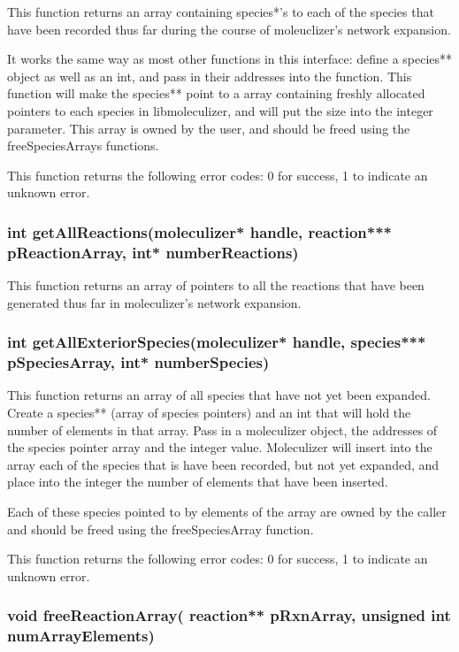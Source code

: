 This function returns an array containing species*'s to each of the
species that have been recorded thus far during the course of
moleuclizer's network expansion.  

It works the same way as most other functions in this interface:
define a species** object as well as an int, and pass in their
addresses into the function.  This function will make the species**
point to a array containing freshly allocated pointers to each species
in libmoleculizer, and will put the size into the integer parameter.
This array is owned by the user, and should be freed using the
freeSpeciesArrays functions.

This function returns the following error codes: 0 for success, 1 to
indicate an unknown error.

\subsubsection{int getAllReactions(moleculizer* handle, reaction***
  pReactionArray, int* numberReactions)}

This function returns an array of pointers to all the reactions that
have been generated thus far in moleculizer's network expansion.  


\subsubsection{int getAllExteriorSpecies(moleculizer* handle,
  species*** pSpeciesArray, int* numberSpecies)}

This function returns an array of all species that have not yet been
expanded.  Create a species** (array of species pointers) and an int
that will hold the number of elements in that array.  Pass in a
moleculizer object, the addresses of the species pointer array and the
integer value.  Moleculizer will insert into the array each of the
species that is have been recorded, but not yet expanded, and place
into the integer the number of elements that have been inserted.  

Each of these species pointed to by elements of the array are owned by
the caller and should be freed using the freeSpeciesArray function.

This function returns the following error codes: 0 for success, 1 to
indicate an unknown error.  

\subsubsection{void freeReactionArray( reaction** pRxnArray, unsigned
  int numArrayElements)}

